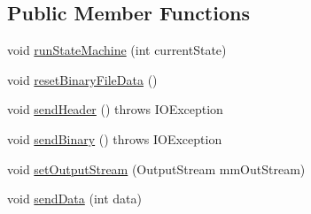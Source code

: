 \subsection*{Public Member Functions}
\begin{DoxyCompactItemize}
\item 
void \hyperlink{classcom_1_1hobby_1_1smart_1_1bluetoothcomm_1_1_system_states_a86f180683e8af92cb4b605cbfc5288a5}{run\+State\+Machine} (int current\+State)
\item 
void \hyperlink{classcom_1_1hobby_1_1smart_1_1bluetoothcomm_1_1_system_states_a87fb0e57edebde31af07339fcb5f7300}{reset\+Binary\+File\+Data} ()
\item 
void \hyperlink{classcom_1_1hobby_1_1smart_1_1bluetoothcomm_1_1_system_states_ad7e78c660a16bba26735f2e2bb68599a}{send\+Header} ()  throws I\+O\+Exception
\item 
void \hyperlink{classcom_1_1hobby_1_1smart_1_1bluetoothcomm_1_1_system_states_aa47a31862e84238f71df30cfe26a6d80}{send\+Binary} ()  throws I\+O\+Exception
\item 
void \hyperlink{classcom_1_1hobby_1_1smart_1_1bluetoothcomm_1_1_system_states_a05d853946c36a52b5400482b2b66584a}{set\+Output\+Stream} (Output\+Stream mm\+Out\+Stream)
\item 
void \hyperlink{classcom_1_1hobby_1_1smart_1_1bluetoothcomm_1_1_system_states_a2fb76b16d2f0857f8951c93d38c8e9b8}{send\+Data} (int data)
\end{DoxyCompactItemize}

